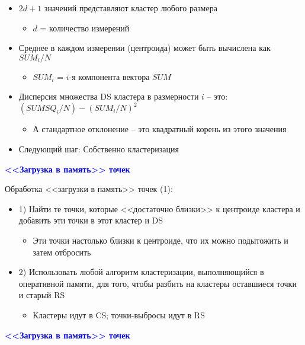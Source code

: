 \documentclass[landscape]{slides}
\begin{document}
\begin{normalsize}
\begin{slide}
\begin{itemize}
\item $2d+1$ значений представляют кластер любого размера
  \begin{itemize}
  \item $d$ = количество измерений
  \end{itemize}
\item Среднее в каждом измерении (центроида) может быть вычислена как $SUM_i/N$
  \begin{itemize}
  \item $SUM_i$ = $i$-я компонента вектора $SUM$
  \end{itemize}
\item Дисперсия множества DS кластера в размерности $i$ -- это:
  $(SUMSQ_i/N) - (SUM_i/N)^2$
  \begin{itemize}
  \item А стандартное отклонение -- это квадратный корень из этого значения
  \end{itemize}
\item Следующий шаг: Собственно кластеризация
\end{itemize}
\end{slide}



\begin{slide}
\textbf{\textcolor{blue}{<<Загрузка в память>> точек}}

Обработка <<загрузки в память>> точек (1):
\begin{itemize}
\item 1) Найти те точки, которые <<достаточно близки>> к центроиде кластера и добавить эти точки в этот кластер и DS
  \begin{itemize}
  \item Эти точки настолько близки к центроиде, что их можно подытожить и затем отбросить
  \end{itemize}
\item 2) Использовать любой алгоритм кластеризации, выполняющийся в оперативной памяти, для того, чтобы разбить на кластеры оставшиеся точки и старый RS
  \begin{itemize}
  \item Кластеры идут в CS; точки-выбросы идут в RS
  \end{itemize}
\end{itemize}
\end{slide}


\begin{slide}
\textbf{\textcolor{blue}{<<Загрузка в память>> точек}}


\end{slide}
\end{normalsize}
\end{document}
